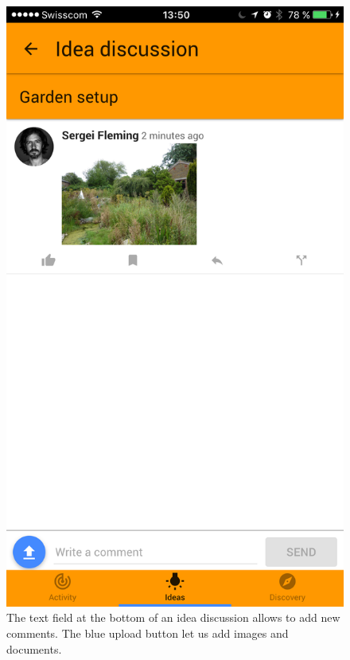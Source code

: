 \documentclass[a4paper,12pt,twoside]{article}
\begin{document}
\begin{figure}[!htb]
    \begin{minipage}[t]{.32\textwidth}
        \centering
        \includegraphics[width=\textwidth]{images/flow_addComment_1.png}
        \caption{The text field at the bottom of an idea discussion allows to add new comments. The blue upload button let us add images and documents.}
    \end{minipage}
    \hfill
    \begin{minipage}[t]{.32\textwidth}

\end{minipage}
\end{figure}
\end{document}
